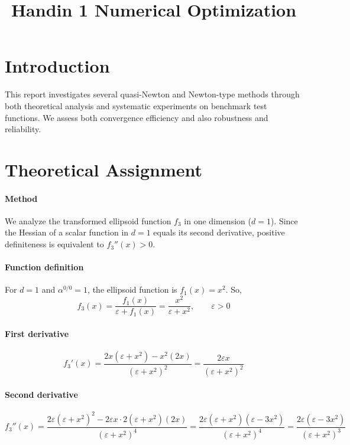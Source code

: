\documentclass[12pt,a4paper]{article}
\title{\LARGE \textbf{Handin 1 Numerical Optimization} \\[1ex]}
\date{}
\begin{document}
\maketitle

\section{Introduction}

This report investigates several quasi-Newton and Newton-type methods through both theoretical analysis and systematic experiments on benchmark test functions. We assess both convergence efficiency and also robustness and reliability.

\section{Theoretical Assignment}

\paragraph{Method}
We analyze the transformed ellipsoid function $f_3$ in one dimension ($d=1$). 
Since the Hessian of a scalar function in $d=1$ equals its second derivative, positive definiteness is equivalent to $f_3''(x)>0$.

\paragraph{Function definition}
For $d=1$ and $\alpha^{0/0}=1$, the ellipsoid function is $f_1(x)=x^2$. 
So,
\[
f_3(x)=\frac{f_1(x)}{\varepsilon+f_1(x)}=\frac{x^2}{\varepsilon+x^2}, \qquad \varepsilon>0
\]

\paragraph{First derivative}

\[
f_3'(x)=\frac{2x(\varepsilon+x^2)-x^2(2x)}{(\varepsilon+x^2)^2}
       =\frac{2\varepsilon x}{(\varepsilon+x^2)^2}
\]

\paragraph{Second derivative}

\[
f_3''(x)
=\frac{2\varepsilon(\varepsilon+x^2)^2-2\varepsilon x\cdot2(\varepsilon+x^2)(2x)}{(\varepsilon+x^2)^4}
=\frac{2\varepsilon(\varepsilon+x^2)(\varepsilon-3x^2)}{(\varepsilon+x^2)^4}
=\frac{2\varepsilon(\varepsilon-3x^2)}{(\varepsilon+x^2)^3}
\]
\end{document}
